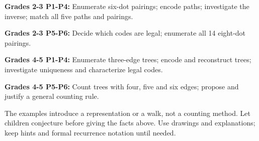 \textbf{Grades 2-3 P1-P4:} Enumerate six-dot pairings; encode paths; investigate the inverse; match all five paths and pairings.

\textbf{Grades 2-3 P5-P6:} Decide which codes are legal; enumerate all 14 eight-dot pairings.

\textbf{Grades 4-5 P1-P4:} Enumerate three-edge trees; encode and reconstruct trees; investigate uniqueness and characterize legal codes.

\textbf{Grades 4-5 P5-P6:} Count trees with four, five and six edges; propose and justify a general counting rule.

The examples introduce a representation or a walk, not a counting method. Let children conjecture before giving the facts above. Use drawings and explanations; keep hints and formal recurrence notation until needed.
